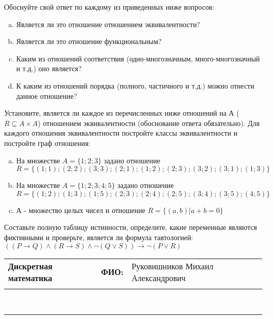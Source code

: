 \documentclass[10pt]{exam}
\newcommand{\class}{Дискретная математика}
\newcommand{\examdate}{}
\begin{document}
\begin{questions}
Обоснуйте свой ответ по каждому из приведенных ниже вопросов:
\begin{enumerate} [a)]\setcounter{enumi}{0}
    \item Является ли это отношение отношением эквивалентности?
    \item Является ли это отношение функциональным?
    \item Каким из отношений соответствия (одно-многозначным, много-многозначный и т.д.) оно является?
    \item К каким из отношений порядка (полного, частичного и т.д.) можно отнести данное отношение?
\end{enumerate}
\question
Установите, является ли каждое из перечисленных ниже отношений на А ($R \subseteq A \times A$) отношением эквивалентности (обоснование ответа обязательно). Для каждого отношения эквивалентности постройте классы 
эквивалентности и постройте граф отношения:
\begin{enumerate} [a)]\setcounter{enumi}{0}
\item На множестве $A = \{1; 2; 3\}$ задано отношение $R = \{(1; 1); (2; 2); (3; 3); (2; 1); (1; 2); (2; 3); (3; 2); (3; 1); (1; 3)\}$
\item На множестве $A = \{1; 2; 3; 4; 5\}$ задано отношение $R = \{(1; 2); (1; 3); (1; 5); (2; 3); (2; 4); (2; 5); (3; 4); (3; 5); (4; 5)\}$
\item А - множество целых чисел и отношение $R = \{(a,b)|a + b = 0\}$
\end{enumerate}\question Составьте полную таблицу истинности, определите, какие переменные являются фиктивными и проверьте, является ли формула тавтологией:
$((P \rightarrow Q) \land (R \rightarrow S) \land \neg (Q \lor S)) \rightarrow \neg (P \lor R)$

\end{questions}
\newpage
\begin{flushright}
\begin{tabular}{p{2.8in} r l}
\textbf{\class} & \textbf{ФИО:} &Руковишников Михаил Александрович
\\

\textbf{\examdate} &&\\
\end{tabular}\\
\end{flushright}
\rule[1ex]{\textwidth}{.1pt}
\end{document}

